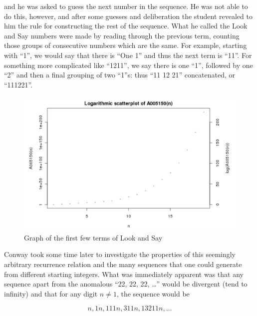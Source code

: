 and he was asked to guess the next number in the sequence. He was not able to do this, however, and after some guesses and deliberation the student revealed to him the rule for constructing the rest of the sequence. What he called the Look and Say numbers were made by reading through the previous term, counting those groups of consecutive numbers which are the same. For example, starting with “1”, we would say that there is “One 1” and thus the next term is “11”. For something more complicated like “1211”, we say there is one “1”, followed by one “2” and then a final grouping of two “1”s: thus “11 12 21” concatenated, or “111221”.\par

\begin{figure}[h!]
\caption{Graph of the first few terms of Look and Say}
\centering
\includegraphics{LookAndSay.JPG}
\end{figure}

Conway took some time later to investigate the properties of this seemingly arbitrary recurrence relation and the many sequences that one could generate from different starting integers. What was immediately apparent was that any sequence apart from the anomalous “22, 22, 22, \ldots” would be divergent (tend to infinity) and that for any digit \(n \neq 1\), the sequence would be

\[n, 1n, 111n, 311n, 13211n, \ldots\]

